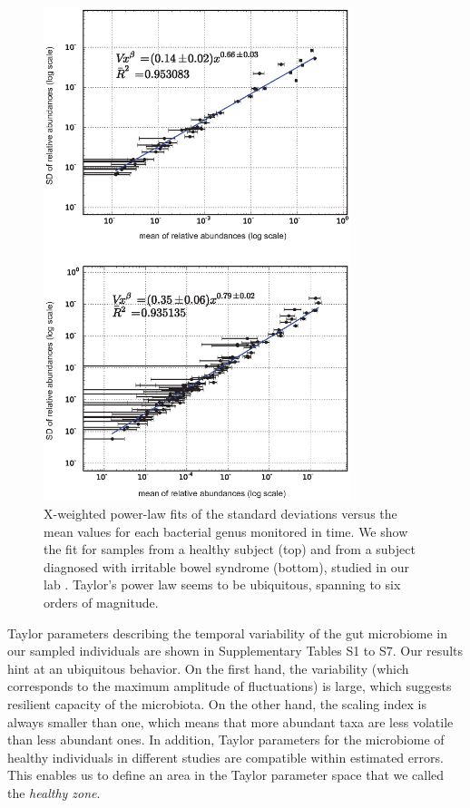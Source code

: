 \begin{figure}
	\centering
	\vspace*{-15mm} %
	\includegraphics[width=0.8\textwidth]{figs/Fig1.eps}
	\caption{X-weighted power-law fits of the standard deviations versus the mean values for each bacterial genus monitored in time. We show the fit for samples from a healthy subject (top) and from a subject diagnosed with irritable bowel syndrome (bottom), studied in our lab \cite{IBS}. Taylor's power law seems to be ubiquitous, spanning to six orders of magnitude.}
	\label{fig:main1}
\end{figure}

Taylor parameters describing the temporal variability of the gut microbiome in our sampled individuals are shown in Supplementary Tables S1 to S7. Our results hint at an ubiquitous behavior. On the first hand, the variability (which corresponds to the maximum amplitude of fluctuations) is large, which suggests resilient capacity of the microbiota. On the other hand, the scaling index is always smaller than one, which means that more abundant taxa are less volatile than less abundant ones. In addition, Taylor parameters for the microbiome of healthy individuals in different studies are compatible within estimated errors. This enables us to define an area in the Taylor parameter space that we called the \emph{healthy zone}. 

